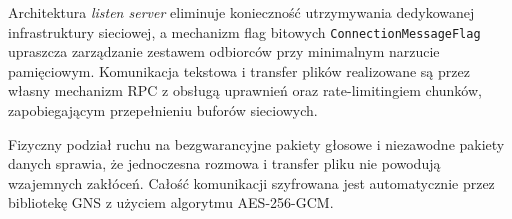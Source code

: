 Architektura \textit{listen server} eliminuje konieczność utrzymywania
dedykowanej infrastruktury sieciowej, a mechanizm flag bitowych
\texttt{ConnectionMessageFlag} upraszcza zarządzanie zestawem odbiorców
przy minimalnym narzucie pamięciowym. Komunikacja tekstowa i transfer
plików realizowane są przez własny mechanizm RPC z obsługą uprawnień
oraz rate-limitingiem chunków, zapobiegającym przepełnieniu buforów
sieciowych.

Fizyczny podział ruchu na bezgwarancyjne pakiety głosowe i niezawodne
pakiety danych sprawia, że jednoczesna rozmowa i transfer pliku nie
powodują wzajemnych zakłóceń. Całość komunikacji szyfrowana jest
automatycznie przez bibliotekę GNS z użyciem algorytmu AES-256-GCM.
